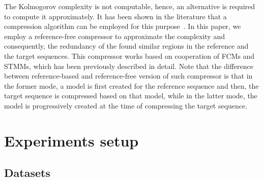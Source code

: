\documentclass[a4paper,num-refs]{oup-contemporary}
\begin{document}
 The Kolmogorov complexity is not computable, hence, an alternative is required to compute it approximately. It has been shown in the literature that a compression algorithm can be employed for this purpose~\cite{zenil2015two,antao2018kolmogorov,faloutsos2007on}. In this paper, we employ a reference-free compressor to approximate the complexity and consequently, the redundancy of the found similar regions in the reference and the target sequences. This compressor works based on cooperation of FCMs and STMMs, which has been previously described in detail. Note that the difference between reference-based and reference-free version of such compressor is that in the former mode, a model is first created for the reference sequence and then, the target sequence is compressed based on that model, while in the latter mode, the model is progressively created at the time of compressing the target sequence.


\section{Experiments setup} \label{sec.experiment}


\subsection{Datasets}
\end{document}
